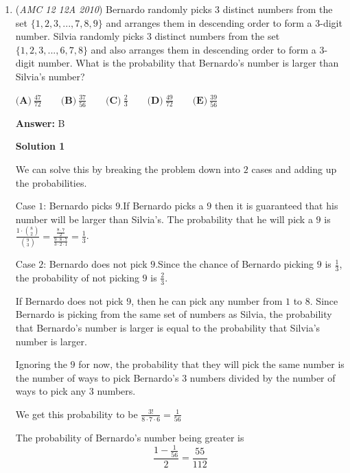 \begin{enumerate}
 Applying the quadratic formula we get that the roots of this equation are $\frac{3\pm\sqrt{3}}{6}$. As the probability of heads is less than $\frac{1}{2}$, we get that the answer is $\boxed{\textbf{(D)}\ \frac{3-\sqrt{3}}{6}}$.

 


	\item (\textit{AMC 12 12A 2010}) Bernardo randomly picks 3 distinct numbers from the set $\{1,2,3,...,7,8,9\}$ and arranges them in descending order to form a 3-digit number. Silvia randomly picks 3 distinct numbers from the set $\{1,2,3,...,6,7,8\}$ and also arranges them in descending order to form a 3-digit number. What is the probability that Bernardo's number is larger than Silvia's number?


 $\textbf{(A)}\ \frac{47}{72} \qquad \textbf{(B)}\ \frac{37}{56} \qquad \textbf{(C)}\ \frac{2}{3} \qquad \textbf{(D)}\ \frac{49}{72} \qquad \textbf{(E)}\ \frac{39}{56}$

 \textbf{Answer: }B



\textbf{Solution 1}

We can solve this by breaking the problem down into $2$ cases and adding up the probabilities.

 
Case $1$: Bernardo picks $9$.If Bernardo picks a $9$ then it is guaranteed that his number will be larger than Silvia's. The probability that he will pick a $9$ is $\frac{1 \cdot \binom{8}{2}}{\binom{9}{3}} = \frac{\frac{8\cdot7}{2}}{\frac{9\cdot8\cdot7}{3\cdot2\cdot1}}=\frac{1}{3}$.

 
Case $2$: Bernardo does not pick $9$.Since the chance of Bernardo picking $9$ is $\frac{1}{3}$, the probability of not picking $9$ is $\frac{2}{3}$.

 If Bernardo does not pick $9$, then he can pick any number from $1$ to $8$. Since Bernardo is picking from the same set of numbers as Silvia, the probability that Bernardo's number is larger is equal to the probability that Silvia's number is larger.

 Ignoring the $9$ for now, the probability that they will pick the same number is the number of ways to pick Bernardo's 3 numbers divided by the number of ways to pick any 3 numbers.

 We get this probability to be $\frac{3!}{8\cdot{7}\cdot{6}} = \frac{1}{56}$

 The probability of Bernardo's number being greater is
 \[\frac{1-\frac{1}{56}}{2} = \frac{55}{112}\]


\end{enumerate}
